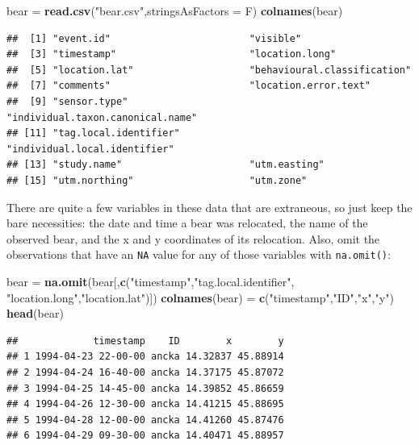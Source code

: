\documentclass[]{book}
\newenvironment{Shaded}{\begin{snugshade}}{\end{snugshade}}
\newcommand{\DataTypeTok}[1]{\textcolor[rgb]{0.13,0.29,0.53}{#1}}
\newcommand{\KeywordTok}[1]{\textcolor[rgb]{0.13,0.29,0.53}{\textbf{#1}}}
\newcommand{\NormalTok}[1]{#1}
\newcommand{\StringTok}[1]{\textcolor[rgb]{0.31,0.60,0.02}{#1}}
\begin{document}
\begin{Shaded}
\begin{Highlighting}[]
\NormalTok{bear =}\StringTok{ }\KeywordTok{read.csv}\NormalTok{(}\StringTok{"bear.csv"}\NormalTok{,}\DataTypeTok{stringsAsFactors =}\NormalTok{ F)}
\KeywordTok{colnames}\NormalTok{(bear)}
\end{Highlighting}
\end{Shaded}

\begin{verbatim}
##  [1] "event.id"                        "visible"                        
##  [3] "timestamp"                       "location.long"                  
##  [5] "location.lat"                    "behavioural.classification"     
##  [7] "comments"                        "location.error.text"            
##  [9] "sensor.type"                     "individual.taxon.canonical.name"
## [11] "tag.local.identifier"            "individual.local.identifier"    
## [13] "study.name"                      "utm.easting"                    
## [15] "utm.northing"                    "utm.zone"
\end{verbatim}

There are quite a few variables in these data that are extraneous, so just keep the bare necessities: the date and time a bear was relocated, the name of the observed bear, and the x and y coordinates of its relocation. Also, omit the observations that have an \texttt{NA} value for any of those variables with \texttt{na.omit()}:

\begin{Shaded}
\begin{Highlighting}[]
\NormalTok{bear =}\StringTok{ }\KeywordTok{na.omit}\NormalTok{(bear[,}\KeywordTok{c}\NormalTok{(}\StringTok{"timestamp"}\NormalTok{,}\StringTok{"tag.local.identifier"}\NormalTok{,}
                        \StringTok{"location.long"}\NormalTok{,}\StringTok{"location.lat"}\NormalTok{)])}
\KeywordTok{colnames}\NormalTok{(bear) =}\StringTok{ }\KeywordTok{c}\NormalTok{(}\StringTok{"timestamp"}\NormalTok{,}\StringTok{"ID"}\NormalTok{,}\StringTok{"x"}\NormalTok{,}\StringTok{"y"}\NormalTok{)}
\KeywordTok{head}\NormalTok{(bear)}
\end{Highlighting}
\end{Shaded}

\begin{verbatim}
##             timestamp    ID        x        y
## 1 1994-04-23 22-00-00 ancka 14.32837 45.88914
## 2 1994-04-24 16-40-00 ancka 14.37175 45.87072
## 3 1994-04-25 14-45-00 ancka 14.39852 45.86659
## 4 1994-04-26 12-30-00 ancka 14.41215 45.88695
## 5 1994-04-28 12-00-00 ancka 14.41260 45.87476
## 6 1994-04-29 09-30-00 ancka 14.40471 45.88957
\end{verbatim}
\end{document}
